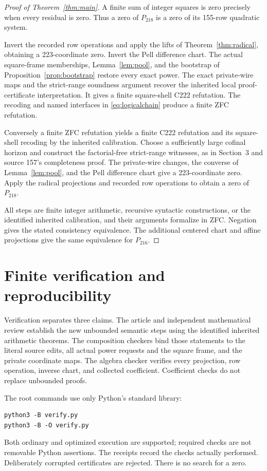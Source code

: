 \documentclass[11pt,letterpaper]{article}
\theoremstyle{remark}
\begin{document}
\begin{proof}[Proof of Theorem~\ref{thm:main}]
A finite sum of integer squares is zero precisely when every
residual is zero. Thus a zero of \(P_{218}\) is a zero of its
155-row quadratic system.

Invert the recorded row operations and apply the lifts of
Theorem~\ref{thm:radical}, obtaining a 223-coordinate zero.
Invert the Pell difference chart. The actual square-frame
memberships, Lemma~\ref{lem:pool}, and the bootstrap of
Proposition~\ref{prop:bootstrap} restore every exact power.
The exact private-wire maps and the strict-range soundness
argument recover the inherited local proof-certificate
interpretation. It gives a finite square-shell C222 refutation.
The recoding and named interfaces in \eqref{eq:logicalchain}
produce a finite ZFC refutation.

Conversely a finite ZFC refutation yields a finite C222
refutation and its square-shell recoding by the inherited
calibration. Choose a sufficiently large cofinal horizon and
construct the factorial-free strict-range witnesses, as in
Section~3 and source 157's completeness proof.
The private-wire changes, the converse of
Lemma~\ref{lem:pool}, and the Pell difference chart give a
223-coordinate zero. Apply the radical projections and
recorded row operations to obtain a zero of \(P_{218}\).

All steps are finite integer arithmetic, recursive syntactic
constructions, or the identified inherited calibration, and
their arguments formalize in ZFC. Negation gives the stated
consistency equivalence. The additional centered chart and
affine projections give the same equivalence for \(P_{216}\).
\end{proof}

\section{Finite verification and reproducibility}

Verification separates three claims. The article and independent
mathematical review establish the new unbounded semantic steps
using the identified inherited arithmetic theorems.
The composition checkers bind those statements to the literal
source edits, all actual power requests and the square frame,
and the private coordinate maps. The algebra checker verifies
every projection, row operation, inverse chart, and collected
coefficient. Coefficient checks do not replace unbounded proofs.

The root commands use only Python's standard library:
\begin{verbatim}
python3 -B verify.py
python3 -B -O verify.py
\end{verbatim}
Both ordinary and optimized execution are supported; required
checks are not removable Python assertions. The receipts record
the checks actually performed. Deliberately corrupted
certificates are rejected. There is no search for a zero.
\end{document}
